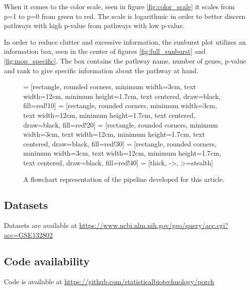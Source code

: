 \documentclass[11pt]{article}
\begin{document}
  When it comes to the color scale, seen in figure \ref{fig:color_scale} it scales from p=1 to p=0 from green to red. The scale is logarithmic in order to better discern pathways with high p-value from pathways with low p-value.

  In order to reduce clutter and excessive information, the sunburst plot utilizes an information box, seen in the center of figures \ref{fig:full_sunburst} and \ref{fig:mop_specific}. The box contains the pathway name, number of genes, p-value and rank to give specific information about the pathway at hand.

  \begin{figure}[t]
    \centering
     = [rectangle, rounded corners, minimum width=3cm, text width=12cm, minimum height=1.7cm, text centered, draw=black, fill=red!10]
     = [rectangle, rounded corners, minimum width=3cm, text width=12cm, minimum height=1.7cm, text centered, draw=black, fill=red!20]
     = [rectangle, rounded corners, minimum width=3cm, text width=12cm, minimum height=1.7cm, text centered, draw=black, fill=red!30]
     = [rectangle, rounded corners, minimum width=3cm, text width=12cm, minimum height=1.7cm, text centered, draw=black, fill=red!40]
     = [thick, ->, >=stealth]

  \caption{ A flowchart representation of the pipeline developed for this article.}
  \label{Pipeline flowchart}
\end{figure}

\subsection*{Datasets}
  Datasets are available at \url{https://www.ncbi.nlm.nih.gov/geo/query/acc.cgi?acc=GSE132802}
\subsection*{Code availability}
  Code is available at \url{https://github.com/statisticalbiotechnology/porch}
\end{document}
